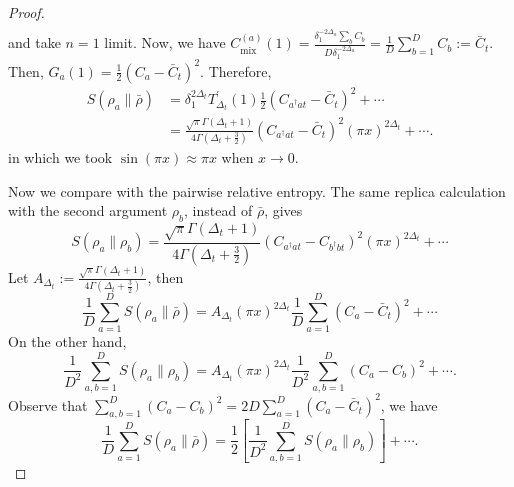 \documentclass{article}
\theoremstyle{plain}
\theoremstyle{definition}
\theoremstyle{plain}
\begin{document}
\begin{proof}
\begin{equation}
\begin{aligned}
\end{aligned}
\end{equation}
and take $n=1$ limit. Now, we have $C_{\text {mix }}^{(a)}(1)=\frac{\delta_1^{-2 \Delta_a} \sum_b C_b}{D \delta_1^{-2 \Delta_a}}=\frac{1}{D} \sum_{b=1}^D C_b:=\bar{C}_t$. Then, $G_a(1)=\frac{1}{2}\left(C_a-\bar{C}_t\right)^2$. Therefore,
\begin{equation}
\begin{aligned}
S\left(\rho_a \| \bar{\rho}\right)&=\delta_1^{2 \Delta_t} T_{\Delta_t}^{\prime}(1) \frac{1}{2}\left(C_{a^{\dagger} a t}-\bar{C}_t\right)^2+\cdots\\
&=\frac{\sqrt{\pi} \Gamma\left(\Delta_t+1\right)}{4 \Gamma\left(\Delta_t+\frac{3}{2}\right)}\left(C_{a^{\dagger} a t}-\bar{C}_t\right)^2(\pi x)^{2 \Delta_t}+\cdots .
    \end{aligned}
\end{equation}
in which we took $\sin(\pi x)\approx \pi x$ when $x\rightarrow 0$. 

Now we compare with the pairwise relative entropy. The same replica calculation with the second argument $\rho_b$, instead of $\bar{\rho}$, gives
\begin{equation}
  S\left(\rho_a \| \rho_b\right)=\frac{\sqrt{\pi} \Gamma\left(\Delta_t+1\right)}{4 \Gamma\left(\Delta_t+\frac{3}{2}\right)}\left(C_{a^{\dagger} a t}-C_{b^{\dagger} b t}\right)^2(\pi x)^{2 \Delta_t}+\cdots  
\end{equation}
Let $A_{\Delta_t}:=\frac{\sqrt{\pi} \Gamma\left(\Delta_t+1\right)}{4 \Gamma\left(\Delta_t+\frac{3}{2}\right)}
$, then
\begin{equation}
    \frac{1}{D} \sum_{a=1}^D S\left(\rho_a \| \bar{\rho}\right)=A_{\Delta_t}(\pi x)^{2 \Delta_t} \frac{1}{D} \sum_{a=1}^D\left(C_a-\bar{C}_t\right)^2+\cdots
\end{equation}
On the other hand,
\begin{equation}
    \frac{1}{D^2} \sum_{a, b=1}^D S\left(\rho_a \| \rho_b\right)=A_{\Delta_t}(\pi x)^{2 \Delta_t} \frac{1}{D^2} \sum_{a, b=1}^D\left(C_a-C_b\right)^2+\cdots .
\end{equation}
Observe that $\sum_{a, b=1}^D\left(C_a-C_b\right)^2=2 D \sum_{a=1}^D\left(C_a-\bar{C}_t\right)^2$, we have
\begin{equation}
    \frac{1}{D} \sum_{a=1}^D S\left(\rho_a \| \bar{\rho}\right)=\frac{1}{2}\left[\frac{1}{D^2} \sum_{a, b=1}^D S\left(\rho_a \| \rho_b\right)\right]+\cdots.
    \label{eq:half-relation}
\end{equation}


\end{proof}
\end{document}
